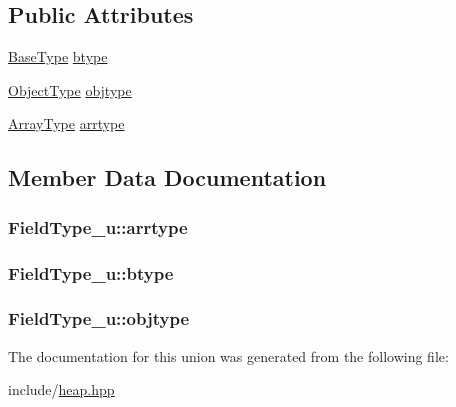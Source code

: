 \subsection*{Public Attributes}
\begin{DoxyCompactItemize}
\item 
\hyperlink{heap_8hpp_aea58c62b09d898b3bbab32faebe7fbae}{Base\+Type} \hyperlink{unionFieldType__u_ab5d0a6459be5729e282c51c622ed161d}{btype}
\item 
\hyperlink{heap_8hpp_afb90a1260754c6e21d4b6610e1682d51}{Object\+Type} \hyperlink{unionFieldType__u_a9b81326f88eeaf4918900bc2e8d5d946}{objtype}
\item 
\hyperlink{heap_8hpp_aa630024ee56aa81525646e18ddf60284}{Array\+Type} \hyperlink{unionFieldType__u_a517ae6c030e07183bc7b779ddeedc249}{arrtype}
\end{DoxyCompactItemize}


\subsection{Member Data Documentation}
\hypertarget{unionFieldType__u_a517ae6c030e07183bc7b779ddeedc249}{
\subsubsection[{arrtype}]{ Field\+Type\+\_\+u\+::arrtype}}\label{unionFieldType__u_a517ae6c030e07183bc7b779ddeedc249}
\hypertarget{unionFieldType__u_ab5d0a6459be5729e282c51c622ed161d}{
\subsubsection[{btype}]{ Field\+Type\+\_\+u\+::btype}}\label{unionFieldType__u_ab5d0a6459be5729e282c51c622ed161d}
\hypertarget{unionFieldType__u_a9b81326f88eeaf4918900bc2e8d5d946}{
\subsubsection[{objtype}]{ Field\+Type\+\_\+u\+::objtype}}\label{unionFieldType__u_a9b81326f88eeaf4918900bc2e8d5d946}


The documentation for this union was generated from the following file\+:\begin{DoxyCompactItemize}
\item 
include/\hyperlink{heap_8hpp}{heap.\+hpp}\end{DoxyCompactItemize}
